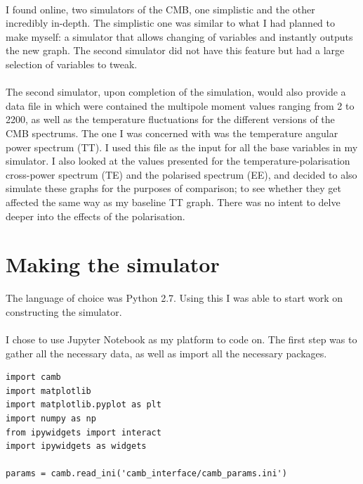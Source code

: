 \documentclass[twoside, fontsize=12pt,
     bibliography=totoc, %
     listof=totoc, %
     index=totoc, %
     onehalfspacing %
]{_MScDiss2017_cls}
\begin{document}
\paragraph{}

I found online, two simulators of the CMB, one simplistic and the other incredibly in-depth. The simplistic one was similar to what I had planned to make myself: a simulator that allows changing of variables and instantly outputs the new graph. The second simulator did not have this feature but had a large selection of variables to tweak.

\paragraph{}

The second simulator, upon completion of the simulation, would also provide a data file in which were contained the multipole moment values ranging from 2 to 2200, as well as the temperature fluctuations for the different versions of the CMB spectrums. The one I was concerned with was the temperature angular power spectrum (TT). I used this file as the input for all the base variables in my simulator. I also looked at the values presented  for the temperature-polarisation cross-power spectrum (TE) and the polarised spectrum (EE), and decided to also simulate these graphs for the purposes of comparison; to see whether they get affected the same way as my baseline TT graph. There was no intent to delve deeper into the effects of the polarisation.

\section{Making the simulator}

The language of choice was Python 2.7. Using this I was able to start work on constructing the simulator.

\paragraph{}

I chose to use Jupyter Notebook as my platform to code on. The first step was to gather all the necessary data, as well as import all the necessary packages. 

\begin{lstfloat}
\begin{lstlisting}[caption={Setting up}, captionpos=b]
import camb
import matplotlib
import matplotlib.pyplot as plt
import numpy as np
from ipywidgets import interact
import ipywidgets as widgets

params = camb.read_ini('camb_interface/camb_params.ini')
\end{lstlisting}
\end{lstfloat}
\end{document}
